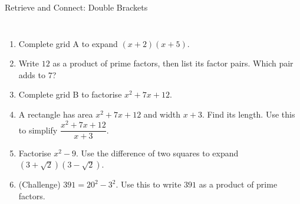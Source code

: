 \documentclass{beamer}
\newcommand{\ashow}[1]{\uncover<2->{\textcolor{red}{\small #1}}}
\newcommand{\tightlist}{%
  \setlength{\itemsep}{0pt}\setlength{\parskip}{0pt}\setlength{\topsep}{0pt}%
}
\begin{document}
\begin{frame}[t]{Retrieve and Connect: Double Brackets}
\begin{columns}[T,onlytextwidth]
\vspace{-1.5em}
\footnotesize
\begin{enumerate}\tightlist
{}
  \item Complete grid A to expand $(x+2)(x+5)$.
        \ashow{$x^2+7x+10$}
  \item Write $12$ as a product of prime factors, then list its factor pairs. Which pair
        adds to $7$?
        \ashow{$2^2\times3$; \; $1\times12$, $2\times6$, $3\times4$; \; $3+4=7$}
  \item Complete grid B to factorise $x^2+7x+12$.
        \ashow{$(x+3)(x+4)$, in either order}
  \item A rectangle has area $x^2+7x+12$ and width $x+3$. Find its length.
        Use this to simplify $\dfrac{x^2+7x+12}{x+3}$.\\[2pt]
        \ashow{$\dfrac{(x+3)(x+4)}{x+3}=x+4$}
  \item Factorise $x^2-9$. Use the difference of two squares to expand
        $(3+\sqrt{2})(3-\sqrt{2})$.
        \ashow{$(x+3)(x-3)$; \; $9-2=7$}
  \item (Challenge) $391=20^2-3^2$. Use this to write $391$ as a product of prime factors.
        \ashow{$(20+3)(20-3)=23\times17$, both prime}
\end{enumerate}
\end{columns}
\end{frame}
\end{document}
